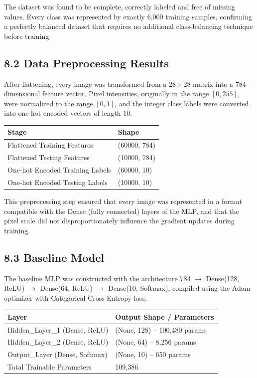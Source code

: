 \documentclass[11pt,a4paper]{article}
\begin{document}
\vspace{0.15cm}

The dataset was found to be complete, correctly labeled and free of missing values. Every class was represented by exactly 6{,}000 training samples, confirming a perfectly balanced dataset that requires no additional class-balancing technique before training.


\subsection*{8.2 Data Preprocessing Results}

After flattening, every image was transformed from a $28\times28$ matrix into a 784-dimensional feature vector. Pixel intensities, originally in the range $[0,255]$, were normalized to the range $[0,1]$, and the integer class labels were converted into one-hot encoded vectors of length 10.

\begin{center}
\begin{tabular}{|p{6cm}|p{5cm}|}
\hline
\textbf{Stage} & \textbf{Shape}\\
\hline
Flattened Training Features & (60000, 784)\\
\hline
Flattened Testing Features & (10000, 784)\\
\hline
One-hot Encoded Training Labels & (60000, 10)\\
\hline
One-hot Encoded Testing Labels & (10000, 10)\\
\hline
\end{tabular}
\end{center}

\vspace{0.15cm}

This preprocessing step ensured that every image was represented in a format compatible with the Dense (fully connected) layers of the MLP, and that the pixel scale did not disproportionately influence the gradient updates during training.


\subsection*{8.3 Baseline Model}

The baseline MLP was constructed with the architecture 784 $\rightarrow$ Dense(128, ReLU) $\rightarrow$ Dense(64, ReLU) $\rightarrow$ Dense(10, Softmax), compiled using the Adam optimizer with Categorical Cross-Entropy loss.

\begin{center}
\begin{tabular}{|p{6cm}|p{6cm}|}
\hline
\textbf{Layer} & \textbf{Output Shape / Parameters}\\
\hline
Hidden\_Layer\_1 (Dense, ReLU) & (None, 128) -- 100{,}480 params\\
\hline
Hidden\_Layer\_2 (Dense, ReLU) & (None, 64) -- 8{,}256 params\\
\hline
Output\_Layer (Dense, Softmax) & (None, 10) -- 650 params\\
\hline
Total Trainable Parameters & 109{,}386\\
\hline
\end{tabular}
\end{center}
\end{document}
